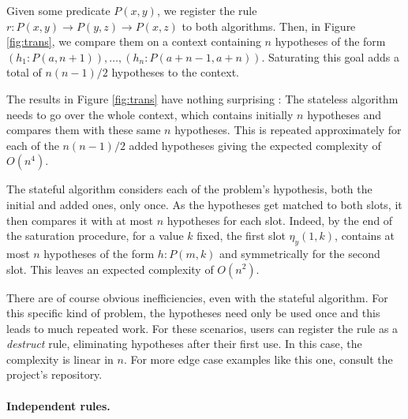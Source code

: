 \documentclass[runningheads]{llncs}
\begin{document}
Given some predicate $P(x, y)$, we register the rule $r : P(x, y) \to P(y, z) \to P(x, z)$ to both algorithms.
Then, in Figure \ref{fig:trans}, we compare them on a context containing $n$ hypotheses of the form $(h_1 : P(a, n + 1)), \dots, (h_n : P(a + n - 1, a + n))$.
Saturating this goal adds a total of $n(n-1)/2$ hypotheses to the context.

The results in Figure \ref{fig:trans} have nothing surprising : The stateless algorithm needs to go over the whole context, which contains initially $n$ hypotheses and compares them with these same $n$ hypotheses.
This is repeated approximately for each of the $n(n-1)/2$ added hypotheses giving the expected complexity of $O(n^4)$.

The stateful algorithm considers each of the problem's hypothesis, both the initial and added ones, only once.
As the hypotheses get matched to both slots, it then compares it with at most $n$ hypotheses for each slot.
Indeed, by the end of the saturation procedure, for a value $k$ fixed, the first slot $\eta_y(1,k)$, contains at most $n$ hypotheses of the form $h : P(m,k)$ and symmetrically for the second slot.
This leaves an expected complexity of $O(n^2)$.

There are of course obvious inefficiencies, even with the stateful algorithm.
For this specific kind of problem, the hypotheses need only be used once and this leads to much repeated work.
For these scenarios, users can register the rule as a \textit{destruct} rule, eliminating hypotheses after their first use.
In this case, the complexity is linear in $n$.
For more edge case examples like this one, consult the project's repository.

\paragraph{Independent rules.}
\end{document}
